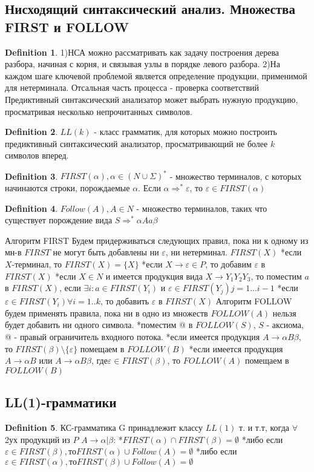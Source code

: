 \documentclass[a4paper]{article}
\theoremstyle{plain}
\theoremstyle{remark}
\theoremstyle{definition}
\newtheorem*{definition-star}{Definition}
\begin{document}
\subsection{Нисходящий синтаксический анализ. Множества FIRST и FOLLOW}
\begin{definition-star}
1)НСА можно рассматривать как задачу построения дерева разбора, начиная с корня, и связывая узлы в порядке левого разбора.
2)На каждом шаге ключевой проблемой является определение продукции, применимой для нетерминала. Отсальная часть процесса - проверка соответствий
Предиктивный синтаксический анализатор может выбрать нужную продукцию, просматривая несколько непрочитанных символов.
\end{definition-star}
\begin{definition-star}
$LL(k)$ - класс грамматик, для которых можно построить предиктивный синтаксический анализатор, просматривающий не более $k$ символов вперед.
\end{definition-star}
\begin{definition-star}
$FIRST(\alpha), \alpha \in (N\cup \Sigma)^*$ - множество терминалов, с которых начинаются строки, порождаемые $\alpha$. Если $\alpha\Rightarrow^*\varepsilon$, то $\varepsilon \in FIRST(\alpha)$
\end{definition-star}
\begin{definition-star}
$Follow(A), A \in N$ - множество терминалов, таких что существует порождение вида $S\Rightarrow^*\alpha Aa\beta$
\end{definition-star}
Алгоритм FIRST
Будем придерживаться следующих правил, пока ни к одному из мн-в $FIRST$ не могут быть добавлены ни $\varepsilon$, ни нетерминал.
$FIRST(X)$
*если $X$-терминал, то $FIRST(X)=\{X\}$
*если $X\rightarrow\varepsilon\in P$, то добавим $\varepsilon$ в $FIRST(X)$
*если $X\in N$ и имеется продукция вида $X\rightarrow Y_1Y_2Y_3$, то поместим $a$ в $FIRST(X)$, если $\exists i: a \in FIRST(Y_i)$ и $\varepsilon \in FIRST(Y_j) j=1...i-1$
*если $\varepsilon \in FIRST(Y_i) \forall i=1..k$, то добавить $\varepsilon$ в $FIRST(X)$
Алгоритм FOLLOW
будем применять правила, пока ни в одно из множеств $FOLLOW(A)$ нельзя будет добавить ни одного символа.
*поместим @ в $FOLLOW(S)$, $S$ - аксиома, @ - правый ограничитель входного потока.
*если имеется продукция $A\rightarrow\alpha B\beta$, то $FIRST(\beta)\setminus\{\varepsilon\}$ помещаем в $FOLLOW(B)$
*если имеется продукция $A\rightarrow\alpha B$ или $A\rightarrow\alpha B\beta$, где$\varepsilon \in FIRST(\beta)$, то $FOLLOW(A)$ помещаем в $FOLLOW(B)$
\subsection{LL(1)-грамматики}
\begin{definition-star} КС-грамматика G принадлежит классу $LL(1)$ т. и т.т, когда $\forall$  2ух продукций из $P$ $A\rightarrow\alpha|\beta$:
*$FIRST(\alpha)\cap FIRST(\beta)=\emptyset$
*либо если $\varepsilon \in FIRST(\beta), то FIRST(\alpha)\cup Follow(A)=\emptyset$
*либо если $\varepsilon \in FIRST(\alpha), то FIRST(\beta)\cup Follow(A)=\emptyset$
\end{definition-star}
\end{document}
